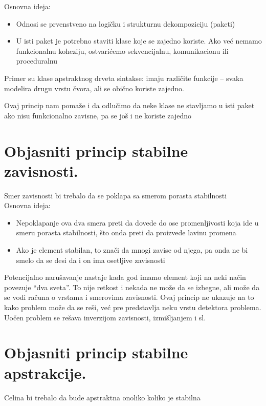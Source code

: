 \documentclass[a4paper]{article}
\begin{document}
Osnovna ideja:
\begin{itemize}
    \item Odnosi se prvenstveno na logičku i strukturnu dekompoziciju (paketi)
    \item U isti paket je potrebno staviti klase koje se zajedno koriste. Ako već nemamo funkcionalnu koheziju, ostvarićemo sekvencijalnu, komunikacionu ili proceduralnu\\
\end{itemize}
    
Primer su klase apstraktnog drveta sintakse: imaju različite funkcije – svaka modelira drugu vrstu čvora, ali se obično koriste zajedno.

Ovaj princip nam pomaže i da odlučimo da neke klase ne stavljamo u isti paket ako nisu funkcionalno zavisne, pa se još i ne koriste zajedno

\section{Objasniti princip stabilne zavisnosti.}
Smer zavisnosti bi trebalo da se poklapa sa smerom porasta stabilnosti\\

Osnovna ideja:
\begin{itemize}
   \item Nepoklapanje ova dva smera preti da dovede do ose promenljivosti koja ide u smeru porasta stabilnosti, što onda preti da proizvede lavinu promena
   \item Ako je element stabilan, to znači da mnogi zavise od njega, pa onda ne bi smelo da se desi da i on ima osetljive zavisnosti\\
\end{itemize}

Potencijalno narušavanje nastaje kada god imamo element koji na neki način povezuje “dva sveta”. To nije retkost i nekada ne može da se izbegne, ali može da se vodi računa o vrstama i smerovima zavisnosti. Ovaj princip ne ukazuje na to kako problem može da se reši, već pre predstavlja neku vrstu detektora problema. Uočen problem se rešava inverzijom zavisnosti, izmišljanjem i sl.


\section{Objasniti princip stabilne apstrakcije.}

Celina bi trebalo da bude apstraktna onoliko koliko je stabilna\\
\end{document}

